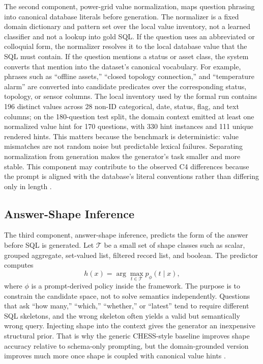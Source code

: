 \documentclass[cmc,article,submit,moreauthors,pdftex]{Definitions/tsp}
\begin{document}
The second component, power-grid value normalization, maps question phrasing into canonical database literals before generation. The normalizer is a fixed domain dictionary and pattern set over the local value inventory, not a learned classifier and not a lookup into gold SQL. If the question uses an abbreviated or colloquial form, the normalizer resolves it to the local database value that the SQL must contain. If the question mentions a status or asset class, the system converts that mention into the dataset's canonical vocabulary. For example, phrases such as ``offline assets,'' ``closed topology connection,'' and ``temperature alarm'' are converted into candidate predicates over the corresponding status, topology, or sensor columns. The local inventory used by the formal run contains 196 distinct values across 28 non-ID categorical, date, status, flag, and text columns; on the 180-question test split, the domain context emitted at least one normalized value hint for 170 questions, with 330 hint instances and 111 unique rendered hints. This matters because the benchmark is deterministic: value mismatches are not random noise but predictable lexical failures. Separating normalization from generation makes the generator's task smaller and more stable. This component may contribute to the observed C4 differences because the prompt is aligned with the database's literal conventions rather than differing only in length \cite{brunner2020valuenet,chen2023large,liu2022semantic}.

\subsection{Answer-Shape Inference}\label{sect:m5}

The third component, answer-shape inference, predicts the form of the answer before SQL is generated. Let $\mathcal{T}$ be a small set of shape classes such as scalar, grouped aggregate, set-valued list, filtered record list, and boolean. The predictor computes
\begin{equation}
h(x) = \arg\max_{t \in \mathcal{T}} p_\phi(t \mid x),
\end{equation}
where $\phi$ is a prompt-derived policy inside the framework. The purpose is to constrain the candidate space, not to solve semantics independently. Questions that ask ``how many,'' ``which,'' ``whether,'' or ``latest'' tend to require different SQL skeletons, and the wrong skeleton often yields a valid but semantically wrong query. Injecting shape into the context gives the generator an inexpensive structural prior. That is why the generic CHESS-style baseline improves shape accuracy relative to schema-only prompting, but the domain-grounded version improves much more once shape is coupled with canonical value hints \cite{liu2023divide,talaei2024chess,wang2023macsql}.
\end{document}
